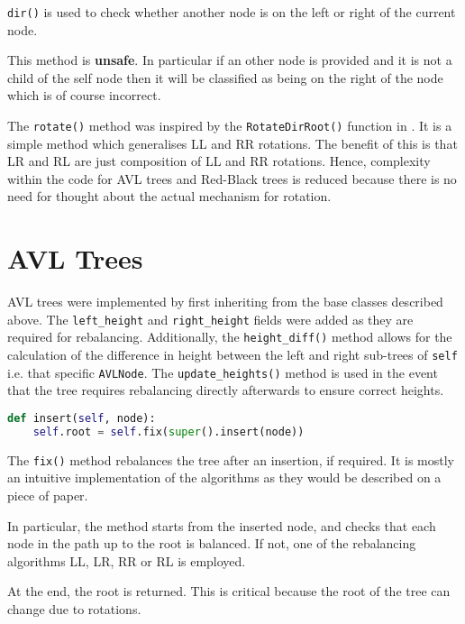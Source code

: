 \documentclass[article]{uom-coursework}
\begin{document}
\texttt{dir()} is used to check whether another node is on the
left or right of the current node.

\begin{note}
This method is \textbf{unsafe}. In particular if an other node
is provided and it is not a child of the self node then it will
be classified as being on the right of the node which is of
course incorrect.
\end{note}

The \texttt{rotate()} method was inspired by the
\texttt{RotateDirRoot()} function in \textcite{wikirbtree}. It
is a simple method which generalises LL and RR rotations. The
benefit of this is that LR and RL are just composition of LL and
RR rotations. Hence, complexity within the code for AVL trees
and Red-Black trees is reduced because there is no need for
thought about the actual mechanism for rotation.

\section{AVL Trees}

AVL trees were implemented by first inheriting from the base
classes described above. The \texttt{left\_height} and
\texttt{right\_height} fields were added as they are required
for rebalancing. Additionally, the \texttt{height\_diff()}
method allows for the calculation of the difference in height
between the left and right sub-trees of \texttt{self} i.e. that
specific \texttt{AVLNode}. The \texttt{update\_heights()} method
is used in the event that the tree requires rebalancing directly
afterwards to ensure correct heights.

\begin{lstlisting}[caption={The main insert function for AVL trees},language=Python]
def insert(self, node):
    self.root = self.fix(super().insert(node))
\end{lstlisting}

The \texttt{fix()} method rebalances the tree after an
insertion, if required. It is mostly an intuitive implementation
of the algorithms as they would be described on a piece of
paper.

In particular, the method starts from the inserted node, and
checks that each node in the path up to the root is balanced. If
not, one of the rebalancing algorithms LL, LR, RR or RL is
employed.

\begin{note}
At the end, the root is returned. This is critical because the
root of the tree can change due to rotations.
\end{note}
\end{document}

